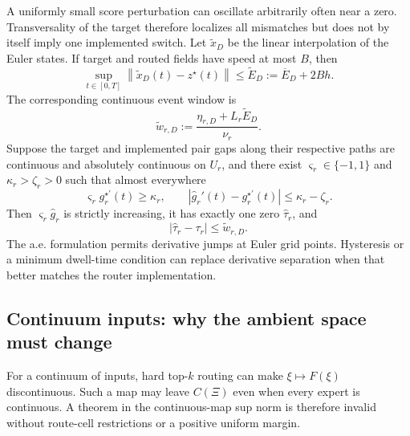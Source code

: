 \documentclass[twoside,11pt]{article}
\newcommand{\norm}[1]{\left\lVert #1\right\rVert}
\newcommand{\abs}[1]{\left\lvert #1\right\rvert}
\begin{document}
A uniformly small score perturbation can oscillate arbitrarily often near a zero.  Transversality of the target therefore localizes all mismatches but does not by itself imply one implemented switch.  Let $\widetilde x_D$ be the linear interpolation of the Euler states.  If target and routed fields have speed at most $B$, then
\begin{equation}
 \sup_{t\in[0,T]}\norm{\widetilde x_D(t)-z^\star(t)}
 \le\widetilde E_D:=\overline E_D+2Bh.
 \label{eq:continuous-route-state-main}
\end{equation}
The corresponding continuous event window is
\begin{equation}
 \widetilde w_{r,D}
 :=\frac{\eta_{r,D}+L_r\widetilde E_D}{\nu_r}.
 \label{eq:continuous-route-window-main}
\end{equation}
Suppose the target and implemented pair gaps along their respective paths are continuous and absolutely continuous on $U_r$, and there exist $\varsigma_r\in\{-1,1\}$ and $\kappa_r>\zeta_r>0$ such that almost everywhere
\begin{equation}
 \varsigma_r g_r^{\star\prime}(t)\ge\kappa_r,
 \qquad
 \abs{\widehat g_r'(t)-g_r^{\star\prime}(t)}
 \le\kappa_r-\zeta_r.
 \label{eq:event-derivative-separation-main}
\end{equation}
Then $\varsigma_r\widehat g_r$ is strictly increasing, it has exactly one zero $\widehat\tau_r$, and
\begin{equation}
 \abs{\widehat\tau_r-\tau_r}\le\widetilde w_{r,D}.
 \label{eq:event-time-bound-main}
\end{equation}
The a.e. formulation permits derivative jumps at Euler grid points.  Hysteresis or a minimum dwell-time condition can replace derivative separation when that better matches the router implementation.

\subsection{Continuum inputs: why the ambient space must change}
\label{sec:routing-lp-main}

For a continuum of inputs, hard top-$k$ routing can make $\xi\mapsto F(\xi)$ discontinuous.  Such a map may leave $C(\Xi)$ even when every expert is continuous.  A theorem in the continuous-map sup norm is therefore invalid without route-cell restrictions or a positive uniform margin.
\end{document}
